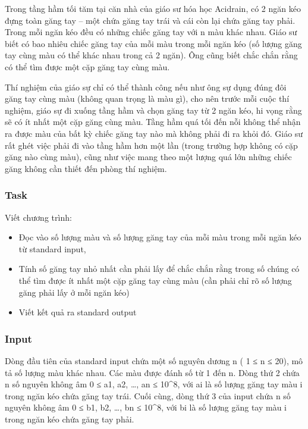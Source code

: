







   Trong tầng hầm tối tăm tại căn nhà của giáo sư hóa học Acidrain, có 2 ngăn kéo đựng toàn găng tay – một chứa găng tay trái và cái còn lại chứa găng tay phải. Trong mỗi ngăn kéo đều có những chiếc găng tay với n màu khác nhau. Giáo sư biết có bao nhiêu chiếc găng tay của mỗi màu trong mỗi ngăn kéo (số lượng găng tay cùng màu có thể khác nhau trong cả 2 ngăn). Ông cũng biết chắc chắn rằng có thể tìm được một cặp găng tay cùng màu.  

   Thí nghiệm của giáo sự chỉ có thể thành công nếu như ông sự dụng đúng đôi găng tay cùng màu (không quan trọng là màu gì), cho nên trước mỗi cuộc thí nghiệm, giáo sự đi xuống tầng hầm và chọn găng tay từ 2 ngăn kéo, hi vọng rằng sẽ có ít nhất một cặp găng cùng màu. Tầng hầm quá tối đến nỗi không thể nhận ra được màu của bất kỳ chiếc găng tay nào mà không phải đi ra khỏi đó. Giáo sư rất ghét việc phải đi vào tầng hầm hơn một lần (trong trường hợp không có cặp găng nào cùng màu), cũng như việc mang theo một lượng quá lớn những chiếc găng không cần thiết đến phòng thí nghiệm.  

\subsubsection{   Task  }

   Viết chương trình:  
\begin{itemize}
	\item     Đọc vào số lượng màu và số lượng găng tay của mỗi màu trong mỗi ngăn kéo từ standard input,   
	\item     Tính số găng tay nhỏ nhất cần phải lấy để chắc chắn rằng trong số chúng có thể tìm được ít nhất một cặp găng tay cùng màu (cần phải chỉ rõ số lượng găng phải lấy ở mỗi ngăn kéo)   
	\item     Viết kết quả ra standard output   
\end{itemize}



\subsubsection{   Input  }

   Dòng đầu tiên của standard input chứa một số nguyên dương n ( 1 ≤ n ≤ 20), mô tả số lượng màu khác nhau. Các màu được đánh số từ 1 đến n. Dòng thứ 2 chứa n số nguyên không âm 0 ≤ a1, a2, …, an ≤ 10^8, với ai là số lượng găng tay màu i trong ngăn kéo chứa găng tay trái. Cuối cùng, dòng thứ 3 của input chứa n số nguyên không âm 0 ≤ b1, b2, …, bn ≤ 10^8, với bi là số lượng găng tay màu i trong ngăn kéo chứa găng tay phải.  

